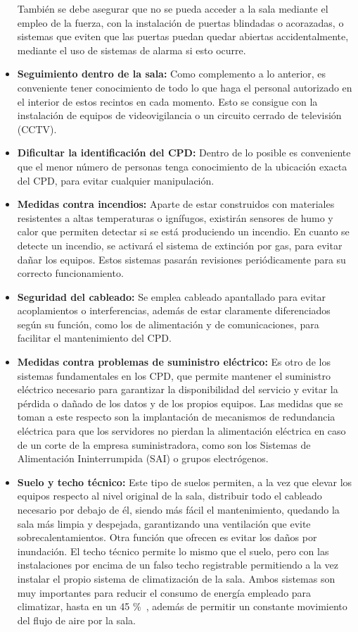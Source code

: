 \begin{itemize}
	También se debe asegurar que no se pueda acceder a la sala mediante el empleo de la fuerza, con la instalación de puertas blindadas o acorazadas, o sistemas que eviten que las puertas puedan quedar abiertas accidentalmente, mediante el uso de sistemas de alarma si esto ocurre.
	\item \textbf{Seguimiento dentro de la sala:} Como complemento a lo anterior, es conveniente tener conocimiento de todo lo que haga el personal autorizado en el interior de estos recintos en cada momento. Esto se consigue con la instalación de equipos de videovigilancia o un circuito cerrado de televisión (CCTV).
	\item \textbf{Dificultar la identificación del CPD:} Dentro de lo posible es conveniente que el menor número de personas tenga conocimiento de la ubicación exacta del CPD, para evitar cualquier manipulación.
	\item \textbf{Medidas contra incendios:} Aparte de estar construidos con materiales resistentes a altas temperaturas o ignífugos, existirán sensores de humo y calor que permiten detectar si se está produciendo un incendio. En cuanto se detecte un incendio, se activará el sistema de extinción por gas, para evitar dañar los equipos. Estos sistemas pasarán revisiones periódicamente para su correcto funcionamiento.
	\item \textbf{Seguridad del cableado:} Se emplea cableado apantallado para evitar acoplamientos o interferencias, además de estar claramente diferenciados según su función, como los de alimentación y de comunicaciones, para facilitar el mantenimiento del CPD\@.
	\item \textbf{Medidas contra problemas de suministro eléctrico:} Es otro de los sistemas fundamentales en los CPD, que permite mantener el suministro eléctrico necesario para garantizar la disponibilidad del servicio y evitar la pérdida o dañado de los datos y de los propios equipos. Las medidas que se toman a este respecto son la implantación de mecanismos de redundancia eléctrica para que los servidores no pierdan la alimentación eléctrica en caso de un corte de la empresa suministradora, como son los Sistemas de Alimentación Ininterrumpida (SAI) o grupos electrógenos.
	\item \textbf{Suelo y techo técnico:} Este tipo de suelos permiten, a la vez que elevar los equipos respecto al nivel original de la sala, distribuir todo el cableado necesario por debajo de él, siendo más fácil el mantenimiento, quedando la sala más limpia y despejada, garantizando una ventilación que evite sobrecalentamientos. Otra función que ofrecen es evitar los daños por inundación. El techo técnico permite lo mismo que el suelo, pero con las instalaciones por encima de un falso techo registrable permitiendo a la vez instalar el propio sistema de climatización de la sala. Ambos sistemas son muy importantes para reducir el consumo de energía empleado para climatizar, hasta en un 45 \%~\cite{polygroup_suelo_2020}, además de permitir un constante movimiento del flujo de aire por la sala.

\end{itemize}
